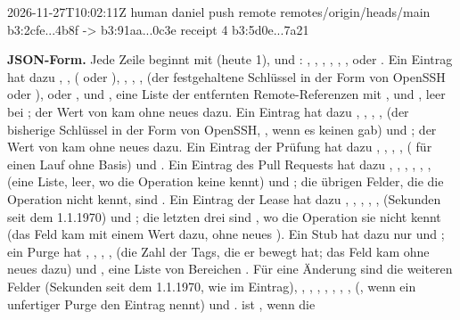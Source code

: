   2026-11-27T10:02:11Z  human daniel  push
    remote remotes/origin/heads/main  b3:2cfe...4b8f -> b3:91aa...0c3e
    receipt 4  b3:5d0e...7a21
\stoptyping

{\bf JSON-Form.} Jede Zeile beginnt mit  (heute 1),  und :
, , , , , ,
 oder .
Ein Eintrag  hat dazu , , 
( oder ), , ,
,  (der festgehaltene Schlüssel in der Form von OpenSSH oder
),  oder ,  und , eine Liste
der entfernten Remote-Referenzen mit ,  und , leer bei
; der Wert  von  kam ohne neues  dazu.
Ein Eintrag  hat dazu , , ,
,  (der bisherige Schlüssel in der Form von OpenSSH, , wenn
es keinen gab) und ; der Wert  von  kam ohne neues
 dazu.
Ein Eintrag der Prüfung hat dazu , , , ,
 ( für einen Lauf ohne Basis) und .
Ein Eintrag des Pull Requests hat dazu , , ,
, , ,  (eine Liste, leer, wo die Operation
keine kennt) und ; die übrigen Felder, die die Operation nicht kennt, sind
.
Ein Eintrag der Lease hat dazu , , , ,
,  (Sekunden seit dem 1.1.1970) und ; die letzten drei sind
, wo die Operation sie nicht kennt (das Feld  kam mit einem Wert dazu,
ohne neues ).
Ein Stub hat dazu nur  und ;
ein Purge hat , , , ,  (die Zahl
der Tags, die er bewegt hat; das Feld kam ohne neues  dazu) und , eine
Liste von Bereichen . Für eine Änderung sind die weiteren Felder 
(Sekunden seit dem 1.1.1970, wie im Eintrag), , , ,
, , , , 
(, wenn ein unfertiger Purge
den Eintrag nennt) und .  ist , wenn die
